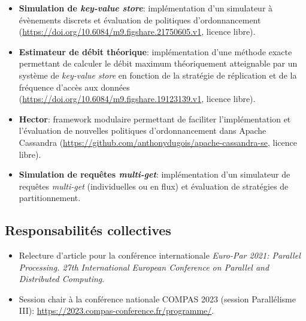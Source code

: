 \documentclass[12pt]{article}
\begin{document}
\begin{itemize}
    \item \textbf{Simulation de \emph{key-value store}}: implémentation d'un simulateur à évènements
    discrets et évaluation de politiques d'ordonnancement
    (\url{https://doi.org/10.6084/m9.figshare.21750605.v1}, licence libre).
    \item \textbf{Estimateur de débit théorique}: implémentation d'une méthode exacte permettant de
    calculer le débit maximum théoriquement atteignable par un système de \emph{key-value store} en
    fonction de la stratégie de réplication et de la fréquence d'accès aux données
    (\url{https://doi.org/10.6084/m9.figshare.19123139.v1}, licence libre).
    \item \textbf{Hector}: framework modulaire permettant de faciliter l'implémentation et
    l'évaluation de nouvelles politiques d'ordonnancement dans Apache Cassandra
    (\url{https://github.com/anthonydugois/apache-cassandra-se}, licence libre).
    \item \textbf{Simulation de requêtes \emph{multi-get}}: implémentation d'un simulateur de
    requêtes \emph{multi-get} (individuelles ou en flux) et évaluation de stratégies de
    partitionnement.
\end{itemize}

\subsection{Responsabilités collectives}

\begin{itemize}
    \item Relecture d'article pour la conférence internationale
    \emph{\foreignlanguage{english}{Euro-Par 2021: Parallel Processing. 27th International European
    Conference on Parallel and Distributed Computing}}.
    \item Session chair à la conférence nationale COMPAS 2023 (session Parallélisme III):
    \url{https://2023.compas-conference.fr/programme/}.
\end{itemize}
\end{document}

